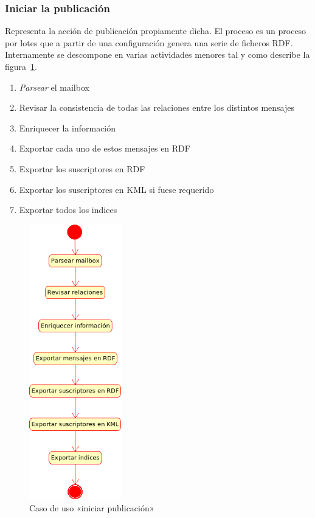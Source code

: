 \subsubsection{Iniciar la publicación}

Representa la acción de publicación propiamente dicha. El proceso es un proceso por 
lotes que a partir de una configuración genera una serie de ficheros RDF. Internamente
se descompone en varias actividades menores tal y como describe la 
figura~\ref{fig:uml:iniciar-publicacion}.

\begin{enumerate}
 \item \emph{Parsear} el mailbox
 \item Revisar la consistencia de todas las relaciones entre los distintos mensajes
 \item Enriquecer la información
 \item Exportar cada uno de estos mensajes en RDF
 \item Exportar los suscriptores en RDF
 \item Exportar los suscriptores en KML si fuese requerido
 \item Exportar todos los indices
\end{enumerate}

\begin{figure}[ht]
 	\centering
	\includegraphics[width=4cm]{images/uml/casos-uso/iniciar-publicacion.png}
	\caption{Caso de uso «iniciar publicación»}
	\label{fig:uml:iniciar-publicacion}
\end{figure}


